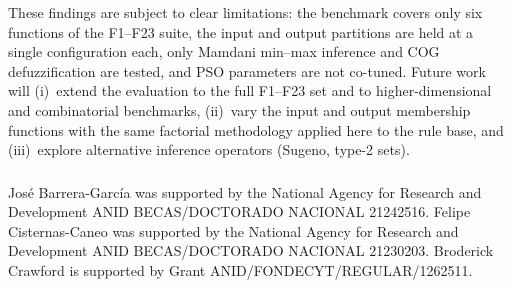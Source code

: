 \documentclass[runningheads]{llncs}
\begin{document}
These findings are subject to clear limitations: the benchmark covers only six functions of the F1--F23 suite, the input and output partitions are held at a single configuration each, only Mamdani min--max inference and COG defuzzification are tested, and PSO parameters are not co-tuned. Future work will (i)~extend the evaluation to the full F1--F23 set and to higher-dimensional and combinatorial benchmarks, (ii)~vary the input and output membership functions with the same factorial methodology applied here to the rule base, and (iii)~explore alternative inference operators (Sugeno, type-2 sets).

\begin{credits}
\subsubsection{\ackname}
José Barrera-García was supported by the National Agency for Research and Development ANID BECAS/DOCTORADO NACIONAL 21242516.
Felipe Cisternas-Caneo was supported by the National Agency for Research and Development ANID BECAS/DOCTORADO NACIONAL 21230203.
Broderick Crawford is supported by Grant ANID/FONDECYT/REGULAR/1262511.

\end{credits}
%


%
\end{document}
